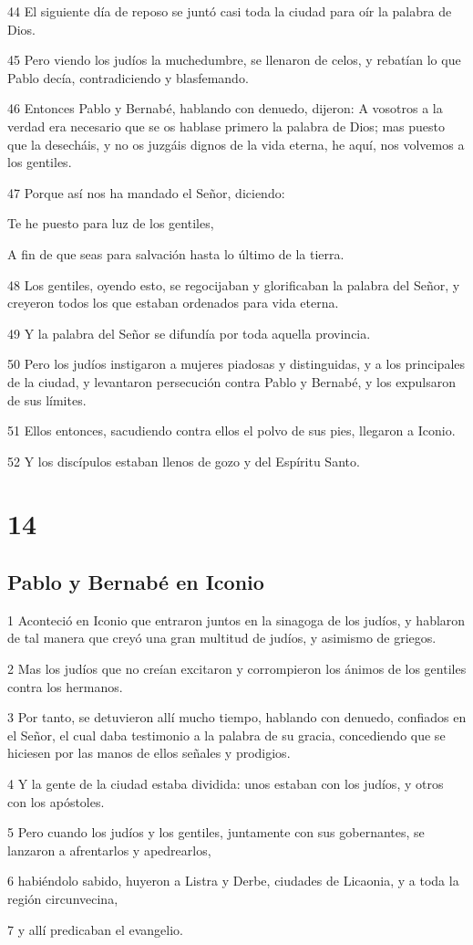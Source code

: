 \par 44 El siguiente día de reposo se juntó casi toda la ciudad para oír la palabra de Dios.
\par 45 Pero viendo los judíos la muchedumbre, se llenaron de celos, y rebatían lo que Pablo decía, contradiciendo y blasfemando.
\par 46 Entonces Pablo y Bernabé, hablando con denuedo, dijeron: A vosotros a la verdad era necesario que se os hablase primero la palabra de Dios; mas puesto que la desecháis, y no os juzgáis dignos de la vida eterna, he aquí, nos volvemos a los gentiles.
\par 47 Porque así nos ha mandado el Señor, diciendo:
\par Te he puesto para luz de los gentiles,
\par A fin de que seas para salvación hasta lo último de la tierra.
\par 48 Los gentiles, oyendo esto, se regocijaban y glorificaban la palabra del Señor, y creyeron todos los que estaban ordenados para vida eterna.
\par 49 Y la palabra del Señor se difundía por toda aquella provincia.
\par 50 Pero los judíos instigaron a mujeres piadosas y distinguidas, y a los principales de la ciudad, y levantaron persecución contra Pablo y Bernabé, y los expulsaron de sus límites.
\par 51 Ellos entonces, sacudiendo contra ellos el polvo de sus pies, llegaron a Iconio.
\par 52 Y los discípulos estaban llenos de gozo y del Espíritu Santo.

\chapter{14}

\section*{Pablo y Bernabé en Iconio}

\par 1 Aconteció en Iconio que entraron juntos en la sinagoga de los judíos, y hablaron de tal manera que creyó una gran multitud de judíos, y asimismo de griegos.
\par 2 Mas los judíos que no creían excitaron y corrompieron los ánimos de los gentiles contra los hermanos.
\par 3 Por tanto, se detuvieron allí mucho tiempo, hablando con denuedo, confiados en el Señor, el cual daba testimonio a la palabra de su gracia, concediendo que se hiciesen por las manos de ellos señales y prodigios.
\par 4 Y la gente de la ciudad estaba dividida: unos estaban con los judíos, y otros con los apóstoles.
\par 5 Pero cuando los judíos y los gentiles, juntamente con sus gobernantes, se lanzaron a afrentarlos y apedrearlos,
\par 6 habiéndolo sabido, huyeron a Listra y Derbe, ciudades de Licaonia, y a toda la región circunvecina,
\par 7 y allí predicaban el evangelio.

